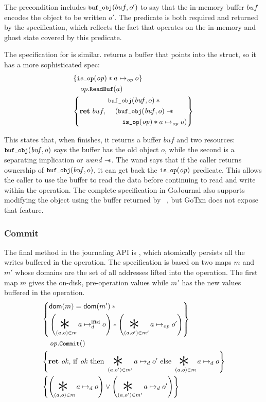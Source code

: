 The precondition includes $\cc{buf_obj}(buf, o')$ to say that the in-memory
buffer $buf$ encodes the object to be written $o'$.
The  predicate is both
required and returned by the specification, which reflects the fact that
 operates on the in-memory and ghost state covered by
this predicate.

The specification for  is similar. 
returns a buffer that points into the  struct, so it has a more
sophisticated spec:
%
\begin{align*}
  \hoareV{\isop \sep a \mapsto_{\mathit{op}} o}%
        {op.\cc{ReadBuf}(a)}%
        {\Ret{buf}
  \begin{aligned}
  &\cc{buf_obj}(\mathit{buf}, o) \sep \phantom{} \\
  &\quad( \cc{buf_obj}(\mathit{buf}, o) \wand \\
  &\quad\quad \isop \sep a \mapsto_{\mathit{op}} o )
    \end{aligned}}
\end{align*}

This states that, when  finishes, it returns a buffer $\mathit{buf}$
and two resources: $\cc{buf_obj}(\mathit{buf}, o)$ says the buffer has the old
object $o$, while the second is a separating implication or \emph{wand} $\mathrel{-\!\!\ast}$.
The wand says that if
the caller returns ownership of $\cc{buf_obj}(\mathit{buf}, o)$, it can get back
the $\cc{is_op}(\mathit{op})$ predicate. This allows the caller to use the
buffer to read the data before continuing to read and write within the
operation. The complete specification in GoJournal also supports modifying the
object using the buffer returned by ~\cite{chajed:gojournal}, but
GoTxn does not expose that feature.

\subsubsection{Commit}

The final method in the journaling API is , which atomically
persists all the writes buffered in the operation. The specification is based on
two maps $m$ and $m'$ whose domains are the set of all addresses lifted into the
operation. The first map $m$ gives the on-disk, pre-operation values while $m'$
has the new values buffered in the operation.
\begin{align*}
  \hoareCV{ \begin{aligned}
              &\dom(m) = \dom(m') \sep {} \\
  &\left( \bigast_{(a,o) \in m} a \mapstoLftd o \right) \sep %
  \left( \bigast_{(a,o') \in m'} a \mapstoOp o' \right)
            \end{aligned}} %
  {\mathit{op}.\cc{Commit}()}%
  {\Ret{\mathit{ok}} \mathrm{if~} \mathit{ok} %
  \mathrm{~then~} \bigast_{(a,o') \in m'} a \mapstoDisk o' \mathrm{~else~} %
    \bigast_{(a,o) \in m} a \mapstoDisk o}%
  {\left( \bigast_{(a,o) \in m} a \mapstoDisk o \right) \lor
    \left( \bigast_{(a,o') \in m'} a \mapstoDisk o' \right) }
\end{align*}

